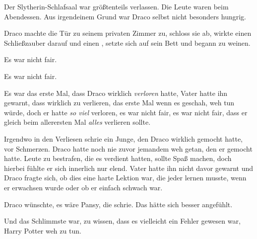 Der Slytherin-Schlafsaal war größtenteils verlassen. Die Leute waren beim Abendessen. Aus irgendeinem Grund war Draco selbst nicht besonders hungrig.

Draco machte die Tür zu seinem privaten Zimmer zu, schloss sie ab, wirkte einen Schließzauber darauf und einen , setzte sich auf sein Bett und begann zu weinen.

Es war nicht fair.

Es war nicht fair.

Es war das erste Mal, dass Draco wirklich \emph{verloren} hatte, Vater hatte ihn gewarnt, dass wirklich zu verlieren, das erste Mal wenn es geschah, weh tun würde, doch er hatte \emph{so viel} verloren, es war nicht fair, es war nicht fair, dass er gleich beim allerersten Mal \emph{alles} verlieren sollte.

Irgendwo in den Verliesen schrie ein Junge, den Draco wirklich gemocht hatte, vor Schmerzen. Draco hatte noch nie zuvor jemandem weh getan, den er gemocht hatte. Leute zu bestrafen, die es verdient hatten, sollte Spaß machen, doch hierbei fühlte er sich innerlich nur elend. Vater hatte ihn nicht davor gewarnt und Draco fragte sich, ob dies eine harte Lektion war, die jeder lernen musste, wenn er erwachsen wurde oder ob er einfach schwach war.

Draco wünschte, es wäre Pansy, die schrie. Das hätte sich besser angefühlt.

Und das Schlimmste war, zu wissen, dass es vielleicht ein Fehler gewesen war, Harry Potter weh zu tun.

